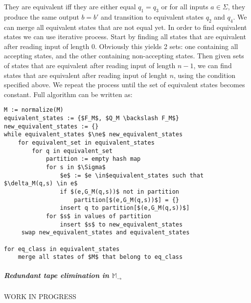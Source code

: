 \documentclass[12pt]{article}
\begin{document}
They are equivalent iff they are either equal $q_1=q_3$ or for all inputs $a\in\Sigma$, they produce the same output $b=b'$ and transition  to equivalent states $q_2$ and $q_4$. We can merge all equivalent states that are not equal yet. In order to find equivalent states we can use iterative process. 
Start by finding all states that are equivalent after reading input of length 0. Obviously this yields 2 sets: one containing all accepting states, and the other containing non-accepting states. Then given sets of states that are equivalent after reading input of length $n-1$, we can find states that are equivalent after reading input of lenght $n$, using the condition specified above. We repeat the process until the set of equivalent states becomes constant.
Full algorithm can be written as:
\begin{lstlisting}
M := normalize(M)
equivalent_states := {$F_M$, $Q_M \backslash F_M$}
new_equivalent_states := {} 
while equivalent_states $\ne$ new_equivalent_states
    for equivalent_set in equivalent_states
        for q in equivalent_set
            partition := empty hash map 
            for s in $\Sigma$
                $e$ := $e \in$equivalent_states such that $\delta_M(q,s) \in e$
                if $(e,G_M(q,s))$ not in partition 
                    partition[$(e,G_M(q,s))$] = {}
                insert q to partition[$(e,G_M(q,s))$]
            for $s$ in values of partition
                insert $s$ to new_equivalent_states
     swap new_equivalent_states and equivalent_states 

for eq_class in equivalent_states
    merge all states of $M$ that belong to eq_class
\end{lstlisting}


\subparagraph{Redundant tape elimination in $\mathbb{M}_\rightarrow$} 
WORK IN PROGRESS
\end{document}
